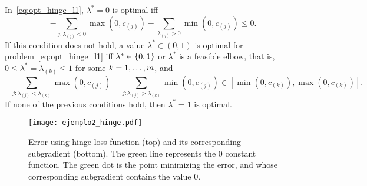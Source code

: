 \begin{prop}\label{prop:hinge_neurocom2020}
    In~\eqref{eq:opt_hinge_l1}, $\lambda^*=0$ is optimal iff
    \begin{equation}\label{eq:sol_hinge_0}
        -\sum_{j: \lambda_{(j)}<0} \max(0, c_{(j)}) - \sum_{\lambda_{(j)}>0} \min(0, c_{(j)}) \leq 0 .
        \end{equation}
        If this condition does not hold, a value $\lambda^* \in (0, 1)$ is optimal for problem~\eqref{eq:opt_hinge_l1} iff $\lambda^* \in \left\{0, 1\right\}$ or $\lambda^*$ is a feasible elbow, that is, $0 \leq \lambda^* = \lambda_{(k)} \leq 1$ for some $k=1, \dotsc, m$, and
    \begin{equation}\label{eq:sol_hinge}
        -\sum_{j: \lambda_{(j)}< \lambda_{(k)}} \max(0, c_{(j)}) - \sum_{j: \lambda_{(j)}>  \lambda_{(k)}} \min(0, c_{(j)}) \in \left[\min(0, c_{(k)}), \max(0, c_{(k)}) \right] .
    \end{equation}
    If none of the previous conditions hold, then $\lambda^*=1$ is optimal.
\end{prop}
\begin{figure}[t!]
    \centering
    \texttt{[image: ejemplo2\_hinge.pdf]}
    \caption{Error using hinge loss function (top) and its corresponding subgradient (bottom). The green line represents the $0$ constant function. The green dot is the point minimizing the error, and whose corresponding subgradient contains the value $0$.}
    \label{fig:hinge_error}
\end{figure}

